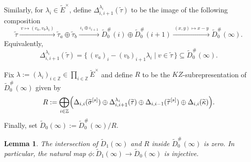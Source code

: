 \documentclass[a4paper,10pt,twoside]{amsart}
\newcommand{\M}{\widetilde{D}_0^\#(\infty)}
\newtheorem{lemma}[theorem]{Lemma}
\theoremstyle{definition}
\numberwithin{equation}{section}
\begin{document}
\noindent
Similarly, for \(\lambda_i\in\widetilde{E}^{\times}\), define
\(\Delta_{i,i+1}^{\lambda_i}(\widetilde{\tau})\) to be the image of the following composition
\[
\widetilde{\tau}
\xrightarrow{\ v\mapsto (v_a, v_b\lambda_i)\ }
\widetilde{\tau}_a\oplus\widetilde{\tau}_b
\xrightarrow{\ \iota_i\oplus\iota_{i+1}\ }
\widetilde{D}_0^\#(i)\oplus\widetilde{D}_0^\#(i+1)
\xrightarrow{\ (x,y)\mapsto x-y\ }
\M .
\]
Equivalently,
\begin{equation}\label{DelLam}
\Delta_{i,i+1}^{\lambda_i}(\widetilde{\tau})
=
\{\, (v_a)_i-(v_b)_{i+1}\lambda_i\mid v\in\widetilde{\tau}\,\}
\subseteq \M .
\end{equation}

Fix $\lambda:=(\lambda_i)_{i\in\mathbb Z}
\in\prod_{i\in\mathbb Z}\widetilde{E}^{\times}
$ and define \(R\) to be the \(KZ\)-subrepresentation of \(\M\) given by
\[
R:=
\bigoplus_{i\in\mathbb Z}
\Bigl(
\Delta_{i,i}(\widetilde{\sigma}^{[s]})
\oplus
\Delta_{i,i+1}^{\lambda_i}(\widetilde{\tau})
\oplus
\Delta_{i,i-1}(\widetilde{\tau}^{[s]})
\oplus
\Delta_{i,i}(\widetilde{\kappa})
\Bigr).
\]
Finally, set $\widetilde{D}_0(\infty):=\M/R.
$

\begin{lemma}\label{D1R0}
The intersection of $\widetilde{D}_1(\infty)$ and $R$ inside $\widetilde{D}_0^\#(\infty)$ is zero. 
In particular, the natural map $\phi :\widetilde{D}_1(\infty) \rightarrow \widetilde{D}_0(\infty)
$ is injective.
\end{lemma}
\end{document}
